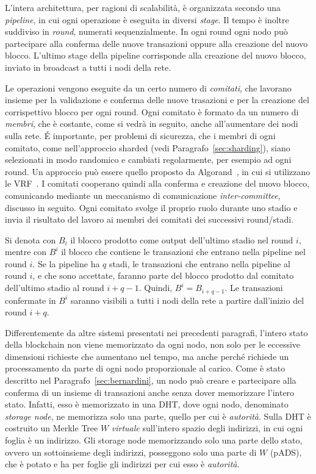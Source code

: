 L'intera architettura, per ragioni di scalabilità, è organizzata secondo una \emph{pipeline}, in cui ogni operazione è eseguita in diversi \emph{stage}. Il tempo è inoltre suddiviso in \emph{round}, numerati sequenzialmente. In ogni round ogni nodo può partecipare alla conferma delle nuove transazioni oppure alla creazione del nuovo blocco. L'ultimo stage della pipeline corrisponde alla creazione del nuovo blocco, inviato in broadcast a tutti i nodi della rete.

Le operazioni vengono eseguite da un certo numero di \emph{comitati}, che lavorano insieme per la validazione e conferma delle nuove trasazioni e per la creazione del corrispettivo blocco per ogni round. Ogni comitato è formato da un numero di \emph{membri}, che è costante, come si vedrà in seguito, anche all'aumentare dei nodi sulla rete. \'E importante, per problemi di sicurezza, che i membri di ogni comitato, come nell'approccio sharded (vedi Paragrafo~\ref{sec:sharding}), siano selezionati in modo randomico e cambiati regolarmente, per esempio ad ogni round. Un approccio può essere quello proposto da Algorand~\cite{gilad2017algorand}, in cui si utilizzano le VRF~\cite{micali1999verifiable}. I comitati cooperano quindi alla conferma e creazione del nuovo blocco, comunicando mediante un meccanismo di comunicazione \emph{inter-committee}, discusso in seguito.
Ogni comitato svolge il proprio ruolo durante uno stadio e invia il risultato del lavoro ai membri dei comitati dei successivi round/stadi.

Si denota con $B_i$ il blocco prodotto come output dell'ultimo stadio nel round $i$, mentre con $B^i$ il blocco che contiene le transazioni che entrano nella pipeline nel round $i$. Se la pipeline ha $q$ stadi, le transazioni che entrano nella pipeline al round $i$, e che sono accettate, faranno parte del blocco prodotto dal comitato dell'ultimo stadio al round $i+q-1$. Quindi, $B^i = B_{i+q-1}$. Le transazioni confermate in $B^i$ saranno visibili a tutti i nodi della rete a partire dall'inizio del round $i+q$.

Differentemente da altre sistemi presentati nei precedenti paragrafi, l'intero stato della blockchain non viene memorizzato da ogni nodo, non solo per le eccessive dimensioni richieste che aumentano nel tempo, ma anche perché richiede un processamento da parte di ogni nodo proporzionale al carico. Come è stato descritto nel Paragrafo~\ref{sec:bernardini}, un nodo può creare e partecipare alla conferma di un insieme di transazioni anche senza dover memorizzare l'intero stato. Infatti, esso è memorizzato in una DHT, dove ogni nodo, denominato \emph{storage node}, ne memorizza solo una parte, quello per cui è \emph{autorità}. Sulla DHT è costruito un Merkle Tree $W$ \emph{virtuale} sull'intero spazio degli indirizzi, in cui ogni foglia è un indirizzo. Gli storage node memorizzando solo una parte dello stato, ovvero un sottoinsieme degli indirizzi, posseggono solo una parte di $W$ (pADS), che è potato e ha per foglie gli indirizzi per cui esso è \emph{autorità}.

